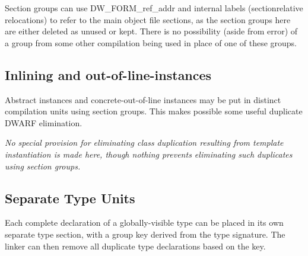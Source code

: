 Section groups can use DW\_FORM\_ref\_addr and internal labels
(section\dash relative relocations) to refer to the main object
file sections, as the section groups here are either deleted
as unused or kept. There is no possibility (aside from error)
of a group from some other compilation being used in place
of one of these groups.


\subsection{Inlining and out-of-line-instances}
\label{app:inliningandoutoflineinstances}

Abstract instances and concrete-out-of-line instances may be
put in distinct compilation units using section groups. This
makes possible some useful duplicate DWARF elimination.

\textit{No special provision for eliminating class duplication
resulting from template instantiation is made here, though
nothing prevents eliminating such duplicates using section
groups.}


\subsection{Separate Type Units}
\label{app:separatetypeunits}

Each complete declaration of a globally-visible type can be
placed in its own separate type section, with a group key
derived from the type signature. The linker can then remove
all duplicate type declarations based on the key.


